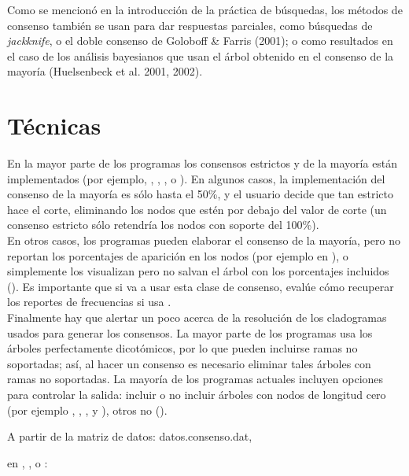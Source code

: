 Como se mencion\'o en la introducci\'on de la pr\'actica de b\'usquedas, los m\'etodos de consenso tambi\'en se  usan para dar respuestas parciales, como b\'usquedas de \textit{jackknife}, o el doble consenso de Goloboff \& Farris (2001); o como resultados en el caso de los an\'alisis bayesianos que usan el \'arbol obtenido en el consenso de la mayor\'ia (Huelsenbeck et al. 2001, 2002).

\section*{T\'ecnicas}
En la mayor parte de los programas los consensos estrictos y de la mayor\'ia est\'an implementados (por ejemplo, , , ,  o ). En algunos casos, la implementaci\'on del consenso de la mayor\'ia es s\'olo hasta el 50\%, y el usuario decide que tan estricto hace el corte, eliminando los nodos que est\'en por debajo del valor de corte (un consenso estricto s\'olo retendr\'ia los nodos con soporte del 100\%).\\
En otros casos, los programas pueden elaborar el consenso de la mayor\'ia, pero no reportan los porcentajes de aparici\'on en los nodos (por ejemplo en ), o simplemente los visualizan pero no salvan el \'arbol con los porcentajes incluidos (). Es importante que si va a usar esta clase de consenso, eval\'ue c\'omo recuperar los reportes de frecuencias si usa .\\
Finalmente hay que alertar un poco acerca de la resoluci\'on de los cladogramas usados para generar los consensos. La mayor parte de los programas usa los \'arboles perfectamente dicot\'omicos, por lo que pueden incluirse ramas no soportadas; as\'i, al hacer un consenso es necesario eliminar tales \'arboles con ramas no soportadas. La mayor\'ia de los programas actuales incluyen opciones para controlar la salida: incluir o no incluir \'arboles con nodos de longitud cero (por ejemplo , , ,  y ), otros no ().


\noindent

A partir de la matriz de datos: datos.consenso.dat, 

en , ,  o :

